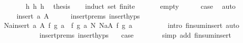 \begin{isabellebody}
%
\isadelimproof
%
\endisadelimproof
%
\isatagproof
{}\isamarkupfalse%
\ {\isacharminus}\ \ \ \isanewline
\ \ \isamarkupfalse%
\ h{}\ h{}\ h{}\ \isamarkupfalse%
\ {\isacharquery}thesis\isanewline
\ \ \isamarkupfalse%
\ {\isacharparenleft}induct\ set{\isacharcolon}\ finite{\isacharparenright}\ \isanewline
\ \ \ \ \isamarkupfalse%
\ empty\isanewline
\ \ \ \ \isamarkupfalse%
\ {\isacharquery}case\ \isamarkupfalse%
\ auto\isanewline
\ \ \isamarkupfalse%
\isanewline
\ \ \ \ \isamarkupfalse%
\ {\isacharparenleft}insert\ a\ A{\isacharparenright}\isanewline
\ \ \ \ \isamarkupfalse%
\ insert{\isachardot}prems\ insert{\isachardot}hyps\ \isamarkupfalse%
\ {}{\isacharcolon}\ {\isachardoublequoteopen}{\isacharparenleft}{\isasymOplus}\isactrlbsub N\isactrlesub a{\isasymin}insert\ a\ A{\isachardot}\ f\ {\isacharparenleft}g\ a{\isacharparenright}{\isacharparenright}\ {\isacharequal}\ f\ {\isacharparenleft}g\ a{\isacharparenright}\ {\isasymoplus}\isactrlbsub N\isactrlesub \ {\isacharparenleft}{\isasymOplus}\isactrlbsub N\isactrlesub a{\isasymin}A{\isachardot}\ f\ {\isacharparenleft}g\ a{\isacharparenright}{\isacharparenright}{\isachardoublequoteclose}\ \ \isanewline
\ \ \ \ \ \ \isamarkupfalse%
\ {\isacharparenleft}intro\ finsum{\isacharunderscore}insert{\isacharcomma}\ auto{\isacharparenright}\isanewline
\ \ \ \ \ \ \isanewline
\ \ \ \ \isamarkupfalse%
\ insert{\isachardot}prems\ insert{\isachardot}hyps\ {}\ \isamarkupfalse%
\ {\isacharquery}case\isanewline
\ \ \ \ \ \ \isamarkupfalse%
\ {\isacharparenleft}simp\ add{\isacharcolon}\ finsum{\isacharunderscore}insert{\isacharparenright}\isanewline
\ \ \isamarkupfalse%
\isanewline
{}\isamarkupfalse%
%
\endisatagproof
{\isafoldproof}%
%
\isadelimproof
\isanewline
%
\endisadelimproof
\isanewline
%
\isadelimtheory
\isanewline
%
\endisadelimtheory
%
\isatagtheory
{}\isamarkupfalse%
%
\endisatagtheory
{\isafoldtheory}%
%
\isadelimtheory
%
\endisadelimtheory
\end{isabellebody}%
